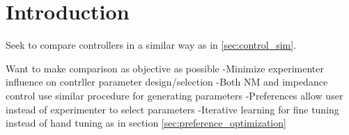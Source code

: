 \section{Introduction}

Seek to compare controllers in a similar way as in \cref{sec:control_sim}.

Want to make comparison as objective as possible
    -Minimize experimenter influence on contrller parameter design/selection
    -Both NM and impedance control use similar procedure for generating
    parameters
    -Preferences allow user instead of experimenter to select parameters
    -Iterative learning for fine tuning instead of hand tuning as in section
    \cref{sec:preference_optimization}
